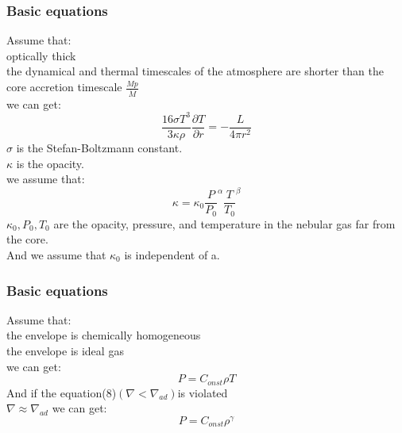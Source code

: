 \documentclass{beamer}
\begin{document}
\begin{frame}
\frametitle{Basic equations}
Assume that:\\
optically thick\\
the dynamical and thermal timescales of the atmosphere are shorter than the core accretion timescale $\frac{Mp}{\dot{M}}$\\
we can get:
\begin{equation}
\frac{16\sigma T^3}{3\kappa \rho}\frac{\partial T}{\partial r}=-\frac{L}{4\pi r^2}
\end{equation}
$\sigma$ is the Stefan-Boltzmann constant.\\
$\kappa$ is the opacity.\\
we assume that:
\begin{equation}
\kappa=\kappa_{0} \frac{P}{P_0}^\alpha \frac{T}{T_0}^\beta
\end{equation}
$\kappa_0,P_0,T_0$ are the opacity, pressure, and temperature in the nebular gas far from the core.\\
And we assume that $\kappa_0$ is independent of a.
\end{frame}

\begin{frame}
\frametitle{Basic equations}
Assume that:\\
the envelope is chemically homogeneous\\
the envelope is ideal gas\\
we can get:
\begin{equation}
\tag{0}
P = C_{onst} \rho T
\end{equation}
And if the equation(8)$(\nabla < \nabla_{ad})$is violated\\
$\nabla \approx \nabla_{ad}$
we can get:
\begin{equation}
P=C_{onst} \rho ^ \gamma
\end{equation}
\end{frame}
\end{document}
